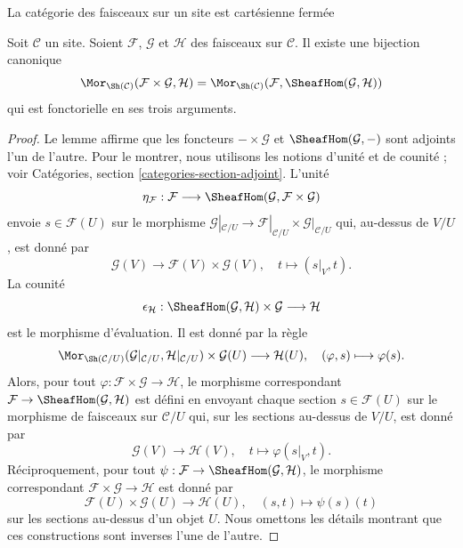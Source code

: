 \begin{lemma}
\label{lemma-internal-hom-sheaf}
\begin{slogan}
La catégorie des faisceaux sur un site est cartésienne fermée
\end{slogan}
Soit $\mathcal{C}$ un site. Soient $\mathcal{F}$, $\mathcal{G}$ et
$\mathcal{H}$ des faisceaux sur $\mathcal{C}$. Il existe une bijection canonique
$$
\Mor_{\Sh(\mathcal{C})}(\mathcal{F}\times\mathcal{G},\mathcal{H}) =
\Mor_{\Sh(\mathcal{C})}(\mathcal{F},\SheafHom(\mathcal{G},\mathcal{H}))
$$
qui est fonctorielle en ses trois arguments.
\end{lemma}

\begin{proof}
Le lemme affirme que les foncteurs $-\times\mathcal{G}$ et
$\SheafHom(\mathcal{G},-)$ sont adjoints l’un de l’autre.
Pour le montrer, nous utilisons les notions d’unité et de counité ; voir
Catégories, section \ref{categories-section-adjoint}.
L’unité
$$
\eta_\mathcal{F} :
\mathcal{F}
\longrightarrow
\SheafHom(\mathcal{G},\mathcal{F}\times\mathcal{G})
$$
envoie $s \in \mathcal{F}(U)$ sur le morphisme
$\mathcal{G}|_{\mathcal{C}/U} \to
\mathcal{F}|_{\mathcal{C}/U}\times\mathcal{G}|_{\mathcal{C}/U}$
qui, au-dessus de $V/U$, est donné par
$$
\mathcal{G}(V) \longrightarrow \mathcal{F}(V)\times \mathcal{G}(V), \quad
t \longmapsto (s|_{V},t).
$$
La counité
$$
\epsilon_{\mathcal{H}} :
\SheafHom(\mathcal{G}, \mathcal{H}) \times \mathcal{G}
\longrightarrow
\mathcal{H}
$$
est le morphisme d’évaluation. Il est donné par la règle
$$
\Mor_{\Sh(\mathcal{C}/U)}(
\mathcal{G}|_{\mathcal{C}/U}, \mathcal{H}|_{\mathcal{C}/U})
\times \mathcal{G}(U)
\longrightarrow
\mathcal{H}(U),\quad
(\varphi, s) \longmapsto \varphi(s).
$$
Alors, pour tout $\varphi : \mathcal{F} \times \mathcal{G} \to \mathcal{H}$,
le morphisme correspondant
$\mathcal{F} \to \SheafHom(\mathcal{G},\mathcal{H})$
est défini en envoyant chaque section $s \in \mathcal{F}(U)$
sur le morphisme de faisceaux sur $\mathcal{C}/U$ qui, sur les
sections au-dessus de $V/U$, est donné par
$$
\mathcal{G}(V) \longrightarrow \mathcal{H}(V),\quad
t \longmapsto \varphi(s|_V, t).
$$
Réciproquement, pour tout
$\psi : \mathcal{F} \to \SheafHom(\mathcal{G}, \mathcal{H})$,
le morphisme correspondant
$\mathcal{F} \times \mathcal{G} \to \mathcal{H}$ est donné par
$$
\mathcal{F}(U) \times \mathcal{G}(U) \longrightarrow \mathcal{H}(U),\quad
(s, t) \longmapsto \psi(s)(t)
$$
sur les sections au-dessus d’un objet $U$. Nous omettons les détails montrant
que ces constructions sont inverses l’une de l’autre.
\end{proof}

